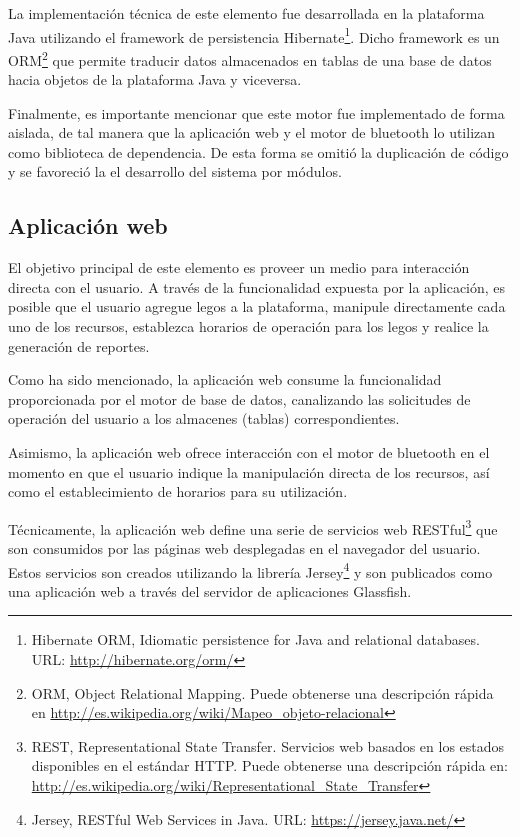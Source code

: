\documentclass[12pt]{article}
\begin{document}
La implementación técnica de este elemento fue desarrollada en la plataforma Java utilizando el framework de persistencia Hibernate\footnote{Hibernate ORM, Idiomatic persistence for Java and relational databases. URL: \url{http://hibernate.org/orm/}}. Dicho framework es un ORM\footnote{ORM, Object Relational Mapping. Puede obtenerse una descripción rápida en \url{http://es.wikipedia.org/wiki/Mapeo_objeto-relacional}} que permite traducir datos almacenados en tablas de una base de datos hacia objetos de la plataforma Java y viceversa.

Finalmente, es importante mencionar que este motor fue implementado de forma aislada, de tal manera que la aplicación web y el motor de bluetooth lo utilizan como biblioteca de dependencia.
De esta forma se omitió la  duplicación de código y se favoreció la el desarrollo del sistema por módulos.

\subsection{Aplicación web} %
\label{sub:aplicacion_web}
El objetivo principal de este elemento es proveer un medio para interacción directa con el usuario.
A través de la funcionalidad expuesta por la aplicación, es posible que el usuario agregue legos a la plataforma, manipule directamente cada uno de los recursos, establezca horarios de operación para los legos y realice la generación de reportes.

Como ha sido mencionado, la aplicación web consume la funcionalidad proporcionada por el motor de base de datos, canalizando las solicitudes de operación del usuario a los almacenes (tablas) correspondientes.

Asimismo, la aplicación web ofrece interacción con el motor de bluetooth en el momento en que el usuario indique la manipulación directa de los recursos, así como el establecimiento de horarios para su utilización.


Técnicamente, la aplicación web define una serie de servicios web RESTful\footnote{REST, Representational State Transfer. Servicios web basados en los estados disponibles en el estándar HTTP. Puede obtenerse una descripción rápida en: \url{http://es.wikipedia.org/wiki/Representational_State_Transfer}} que son consumidos por las páginas web desplegadas en el navegador del usuario. Estos servicios son creados utilizando la librería Jersey\footnote{Jersey, RESTful Web Services in Java. URL: \url{https://jersey.java.net/}} y son publicados como una aplicación web a través del servidor de aplicaciones Glassfish.
\end{document}
